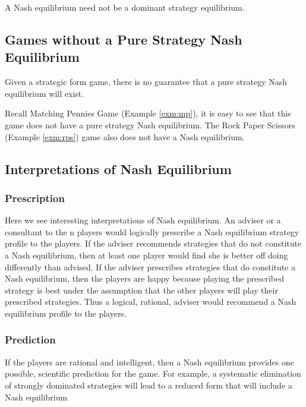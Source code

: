 \begin{note}
	A Nash equilibrium need not be a dominant strategy equilibrium.
\end{note}
\subsection{Games without a Pure Strategy Nash Equilibrium}
Given a strategic form game, there is no guarantee that a pure strategy Nash equilibrium will exist.

Recall Matching Pennies Game (Example \ref{exm:mp}), it is easy to see that this game does not have a pure strategy Nash equilibrium.
The Rock Paper Scissors (Example \ref{exm:rps}) game also does not have a Nash equilibrium.
\subsection{Interpretations of Nash Equilibrium}
\subsubsection{Prescription}
Here we see interesting interpretations of Nash equilibrium.
An adviser or a consultant to the n players would logically prescribe a Nash equilibrium strategy profile to the players.
If the adviser recommends strategies that do not constitute a Nash equilibrium, then at least one player would find she is better off doing differently than advised.
If the adviser prescribes strategies that do constitute a Nash equilibrium, then the players are happy because playing the prescribed strategy is best under the assumption that the other players will play their prescribed strategies.
Thus a logical, rational, adviser would recommend a Nash equilibrium profile to the players.
\subsubsection{Prediction}
If the players are rational and intelligent, then a Nash equilibrium provides one possible, scientific prediction for the game.
For example, a systematic elimination of strongly dominated strategies will lead to a reduced form that will include a Nash equilibrium %
